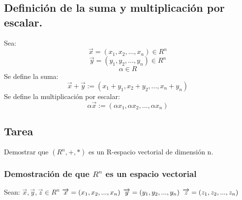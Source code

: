 \documentclass{book}
\begin{document}
\subsection{Definición de la suma y multiplicación por escalar.}
Sea:
$$\overrightarrow{x}=(x_{1},x_{2},...,x_{n})\in R^n$$
$$\overrightarrow{y}=(y_{1},y_{2},...,y_{n})\in R^n$$
$$\alpha \in R$$
Se define la suma:
$$\overrightarrow{x}+\overrightarrow{y}:=(x_{1}+y_{1},x_{2}+y_{2},...,x_{n}+y_{n})$$
Se define la multiplicación por escalar:
$$\alpha\overrightarrow{x}:=(\alpha x_{1},\alpha x_{2},...,\alpha x_{n})$$
\subsection{Tarea}
Demostrar que $(R^n,+,*)$ es un R-espacio vectorial de dimensión n.
\subsubsection{Demostración de que $R^n$ es un espacio vectorial}
Sean: $\overrightarrow{x},\overrightarrow{y},\overrightarrow{z}\in R^n$
$\\\overrightarrow{x}=(x_{1},x_{2},...,x_{n})$
$\\\overrightarrow{y}=(y_{1},y_{2},...,y_{n})$
$\\\overrightarrow{z}=(z_{1},z_{2},...,z_{n})$
\end{document}
